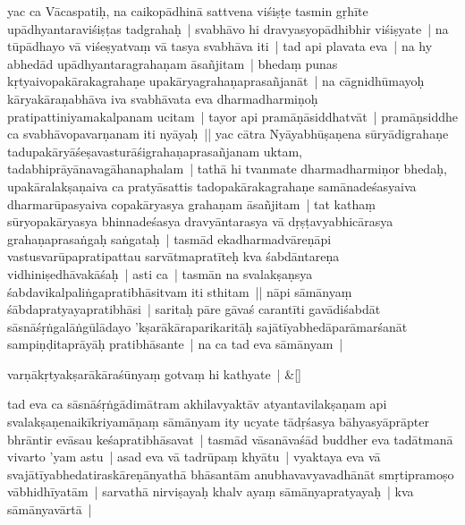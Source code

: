 \documentclass[article,12pt,a4paper]{memoir}%
\newcounter{parCount}
\begin{document}
	  
	  \pstart \leavevmode%
	\label{thakur75-62.24}yac ca Vācaspatiḥ, na caikopādhinā sattvena viśiṣṭe tasmin gṛhīte upādhyantaraviśiṣṭas tadgrahaḥ | svabhāvo hi dravyasyopādhibhir viśiṣyate | na tūpādhayo vā viśeṣyatvaṃ vā tasya svabhāva iti | tad api plavata eva | na hy abhedād upādhyantaragrahaṇam āsañjitam | bhedaṃ punas kṛtyaivopakārakagrahaṇe upakāryagrahaṇaprasañjanāt | na cāgnidhūmayoḥ kāryakāraṇabhāva iva svabhāvata eva dharmadharmiṇoḥ pratipattiniyamakalpanam ucitam | tayor api pramāṇāsiddhatvāt | pramāṇsiddhe ca svabhāvopavarṇanam iti nyāyaḥ || \label{thakur75-63.3} yac cātra Nyāyabhūṣaṇena sūryādigrahaṇe tadupakāryāśeṣavasturāśigrahaṇaprasañjanam uktam, tadabhiprāyānavagāhanaphalam | tathā hi tvanmate dharmadharmiṇor bhedaḥ, upakāralakṣaṇaiva ca pratyāsattis tadopakārakagrahaṇe samānadeśasyaiva dharmarūpasyaiva copakāryasya grahaṇam āsañjitam | tat kathaṃ sūryopakāryasya bhinnadeśasya dravyāntarasya vā dṛṣṭavyabhicārasya grahaṇaprasaṅgaḥ saṅgataḥ | tasmād ekadharmadvāreṇāpi vastusvarūpapratipattau sarvātmapratīteḥ kva śabdāntareṇa vidhiniṣedhāvakāśaḥ | asti ca | tasmān na svalakṣaṇsya śabdavikalpaliṅgapratibhāsitvam iti sthitam || \label{thakur75-63.10} nāpi sāmānyaṃ śābdapratyayapratibhāsi | saritaḥ pāre gāvaś carantīti gavādiśabdāt sāsnāśṛṅgalāṅgūlādayo 'kṣarākāraparikaritāḥ sajātīyabhedāparāmarśanāt sampiṇḍitaprāyāḥ pratibhāsante | na ca tad eva sāmānyam |
	{}
	\pend%
      
	    
	    \stanza[\smallbreak]
	  varṇākṛtyakṣarākāraśūnyaṃ gotvaṃ hi kathyate | \&[\smallbreak]
	  
	  
	  

	  
	  \pstart \leavevmode%
	\label{thakur75-63.14}tad eva ca sāsnāśṛṅgādimātram akhilavyaktāv atyantavilakṣaṇam api svalakṣaṇenaikīkriyamāṇaṃ sāmānyam ity ucyate tādṛśasya bāhyasyāprāpter bhrāntir evāsau keśapratibhāsavat | tasmād vāsanāvaśād buddher eva tadātmanā vivarto 'yam astu | asad eva vā tadrūpaṃ khyātu | vyaktaya eva vā svajātīyabhedatiraskāreṇānyathā bhāsantām anubhavavyavadhānāt smṛtipramoṣo vābhidhīyatām | sarvathā nirviṣayaḥ khalv ayaṃ sāmānyapratyayaḥ | kva sāmānyavārtā | 
	{}
	\pend%
      
\end{document}
